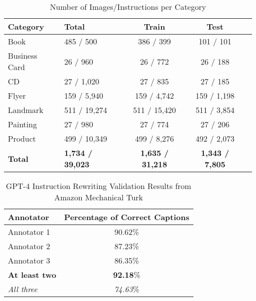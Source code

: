 \begin{table}[t]
    \centering
    \scriptsize
    \label{tab:dataset_statistics}
    \begin{tabular}{llccc}
        \toprule
        \textbf{Category} & \textbf{Total} & \textbf{Train} & \textbf{Test} \\
        \midrule
        Book              & 485 / 500                               & 386 / 399                               & 101 / 101                               \\
        Business Card     & 26 / 960                                & 26 / 772                                & 26 / 188                                \\
        CD               & 27 / 1,020                              & 27 / 835                                & 27 / 185                                \\
        Flyer & 159 / 5,940                             & 159 / 4,742                             & 159 / 1,198                             \\
        Landmark         & 511 / 19,274                            & 511 / 15,420                            & 511 / 3,854                             \\
        Painting & 27 / 980                                & 27 / 774                                & 27 / 206                                \\
        Product          & 499 / 10,349                            & 499 / 8,276                             & 492 / 2,073                             \\
        \midrule
        \textbf{Total}   & \textbf{1,734 / 39,023}                 & \textbf{1,635 / 31,218}                 & \textbf{1,343 / 7,805}                  \\
        \bottomrule
    \end{tabular}
    \caption{Number of Images/Instructions per Category}
    \label{tab:sources}
\end{table}
\begin{table}[t]
    \centering
    \footnotesize
    \begin{tabular}{l  c}
        \toprule
         \textbf{Annotator}& \textbf{Percentage of Correct Captions}\\ 
         \midrule
         Annotator 1	& 90.62\%\\ 
         Annotator 2	& 87.23\%\\
         Annotator 3	& 86.35\%\\
         \midrule
         \textbf{At least two }& \textbf{92.18}\%\\
         \midrule
         \textit{All three }& \textit{74.63}\% \\
         \bottomrule
    \end{tabular}
    \caption{GPT-4 Instruction Rewriting Validation Results from Amazon Mechanical Turk }
    \label{tab:annotator_data}
\end{table}
